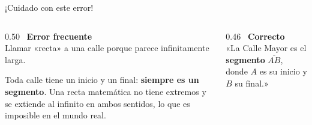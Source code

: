 \documentclass[aspectratio=169, 10pt, spanish]{beamer}
\begin{document}
\begin{frame}{¡Cuidado con este error!}
  \begin{errorbox}
    \begin{columns}[c]
      \begin{column}{0.50\textwidth}
        \incorrecto\ \textbf{Error frecuente}\\[6pt]
        Llamar «recta» a una calle porque parece
        infinitamente larga.\\[6pt]
        \begin{center}
        \end{center}
        \vspace{4pt}
        \AlmFontFootnote
        Toda calle tiene un inicio y un final:
        \textbf{siempre es un segmento}.
        Una recta matemática no tiene extremos
        y se extiende al infinito en ambos sentidos,
        lo que es imposible en el mundo real.
      \end{column}
      \begin{column}{0.46\textwidth}
        \correcto\ \textbf{Correcto}\\[6pt]
        \AlmFontSmall
        «La Calle Mayor es el
        \textbf{segmento} $\overline{AB}$,
        donde $A$ es su inicio y $B$ su final.»\\[8pt]
        \begin{center}
        \end{center}
      \end{column}
    \end{columns}
  \end{errorbox}
\end{frame}
\end{document}
